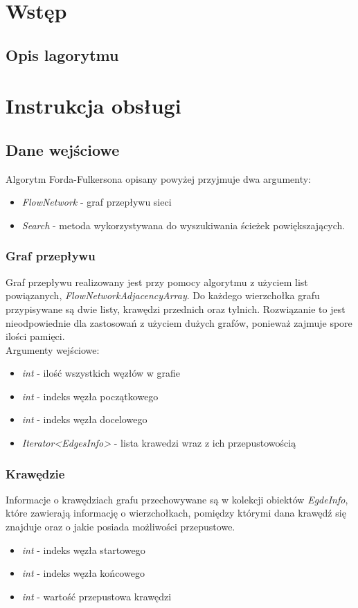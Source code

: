 \documentclass[10pt]{minutes}
\begin{document}
\MakeMinutesMeta


\section{Wstęp} %
  \subsection{Opis lagorytmu}

\section{Instrukcja obsługi}
  \subsection{Dane wejściowe}
    Algorytm Forda-Fulkersona opisany powyżej przyjmuje dwa argumenty:
    \begin{itemize}
      \item \emph{FlowNetwork} - graf przepływu sieci
      \item \emph{Search} - metoda wykorzystywana do wyszukiwania ścieżek powiększających.
    \end{itemize}

  \subsubsection{Graf przepływu}
    Graf przepływu realizowany jest przy pomocy algorytmu z użyciem list powiązanych, \emph{FlowNetworkAdjacencyArray}. Do każdego wierzchołka grafu przypisywane są dwie listy,
 krawędzi przednich oraz tylnich. Rozwiązanie to jest nieodpowiednie dla zastosowań z użyciem dużych grafów, ponieważ zajmuje spore ilości pamięci.\\
Argumenty wejściowe:
    \begin{itemize}
      \item \emph{int} - ilość wszystkich węzłów w grafie
      \item \emph{int} - indeks węzła początkowego
      \item \emph{int} - indeks węzła docelowego
      \item \emph{Iterator<EdgesInfo>} - lista krawedzi wraz z ich przepustowością
    \end{itemize}

  \subsubsection{Krawędzie}
    Informacje o krawędziach grafu przechowywane są w kolekcji obiektów \emph{EgdeInfo}, które zawierają informację o wierzchołkach,
pomiędzy którymi dana krawędź się znajduje oraz o jakie posiada możliwości przepustowe.
    \begin{itemize}
      \item \emph{int} - indeks węzła startowego
      \item \emph{int} - indeks węzła końcowego
      \item \emph{int} - wartość przepustowa krawędzi
    \end{itemize}
\end{document}
